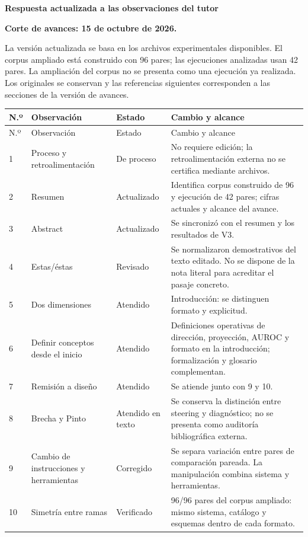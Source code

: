 \documentclass[10pt]{article}
\begin{document}
\begin{center}\Large\textbf{Respuesta actualizada a las observaciones del tutor}\end{center}
\textbf{Corte de avances: 15 de octubre de 2026.}

La versión actualizada se basa en los archivos experimentales disponibles. El corpus ampliado está construido con 96 pares; las ejecuciones analizadas usan 42 pares. La ampliación del corpus no se presenta como una ejecución ya realizada. Los originales se conservan y las referencias siguientes corresponden a las secciones de la versión de avances.

\small
\begin{longtable}{@{}p{0.5cm}p{3.2cm}p{2.5cm}p{10.1cm}@{}}
\toprule N.º & Observación & Estado & Cambio y alcance \\\midrule
\endfirsthead
\toprule N.º & Observación & Estado & Cambio y alcance \\\midrule
\endhead
1 & Proceso y retroalimentación & De proceso & No requiere edición; la retroalimentación externa no se certifica mediante archivos. \\[4pt]
2 & Resumen & Actualizado & Identifica corpus construido de 96 y ejecución de 42 pares; cifras actuales y alcance del avance. \\[4pt]
3 & Abstract & Actualizado & Se sincronizó con el resumen y los resultados de V3. \\[4pt]
4 & Estas/éstas & Revisado & Se normalizaron demostrativos del texto editado. No se dispone de la nota literal para acreditar el pasaje concreto. \\[4pt]
5 & Dos dimensiones & Atendido & Introducción: se distinguen formato y explicitud. \\[4pt]
6 & Definir conceptos desde el inicio & Atendido & Definiciones operativas de dirección, proyección, AUROC y formato en la introducción; formalización y glosario complementan. \\[4pt]
7 & Remisión a diseño & Atendido & Se atiende junto con 9 y 10. \\[4pt]
8 & Brecha y Pinto & Atendido en texto & Se conserva la distinción entre steering y diagnóstico; no se presenta como auditoría bibliográfica externa. \\[4pt]
9 & Cambio de instrucciones y herramientas & Corregido & Se separa variación entre pares de comparación pareada. La manipulación combina sistema y herramientas. \\[4pt]
10 & Simetría entre ramas & Verificado & 96/96 pares del corpus ampliado: mismo sistema, catálogo y esquemas dentro de cada formato. \\[4pt]

\end{longtable}
\end{document}
